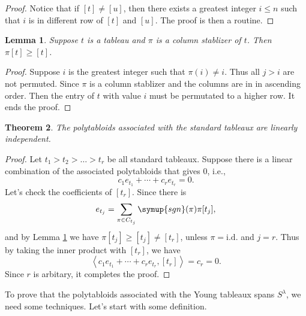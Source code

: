 \documentclass{assignment}[2019/10/15]
\newcommand{\lr}[3]{\left#1#3\right#2}
\theoremstyle{plain}
\newtheorem{theorem}{Theorem}[section]
\newtheorem{lemma}[theorem]{Lemma}
\newcommand{\sgn}{\mathop{}\!\symup{sgn}}
\newcommand{\id}{\text{i.d.}}
\begin{document}
    \begin{proof}
        Notice that if $[t]\neq [u]$, then there exists a greatest integer $i\leq n$ such that $i$ is in different row of $[t]$ and $[u]$. The proof is then a routine.
    \end{proof}

    \begin{lemma}\label{lem: leq}
        Suppose $t$ is a tableau and $\pi$ is a column stablizer of $t$. Then $\pi [t]\geq [t]$.
    \end{lemma}

    \begin{proof}
        Suppose $i$ is the greatest integer such that $\pi (i)\neq i$. Thus all $j>i$ are not permuted. Since $\pi$ is a column stablizer and the columns are in in ascending order. Then the entry of $t$ with value $i$ must be permutated to a higher row. It ends the proof.
    \end{proof}

    \begin{theorem}
        The polytabloids associated with the standard tableaux are linearly independent.
    \end{theorem}

    \begin{proof}
        Let $t_1> t_2 > \dotsc > t_r$ be all standard tableaux. Suppose there is a linear combination of the associated polytabloids that gives 0, i.e.,
        \begin{equation}
            c_1e_{t_1}+\dotsb + c_re_{t_r}=0.
        \end{equation}
        Let's check the coefficients of $[t_r]$. Since there is
        \begin{equation}
            e_{t_j} = \sum_{\pi\in C_{t_j}}\sgn(\pi)\pi[t_j],
        \end{equation}
        and by Lemma \ref{lem: leq} we have $\pi[t_j]\geq[t_j]\neq [t_r]$, unless $\pi=\id$ and $j=r$. Thus by taking the inner product with $[t_r]$, we have
        \begin{equation}
            \lr<>{c_1e_{t_1}+\dotsb + c_re_{t_r}, [t_r]} = c_r = 0.
        \end{equation}
        Since $r$ is arbitary, it completes the proof.
    \end{proof}

    To prove that the polytabloids associated with the Young tableaux spans $S^\lambda$, we need some techniques. Let's start with some definition.
\end{document}
